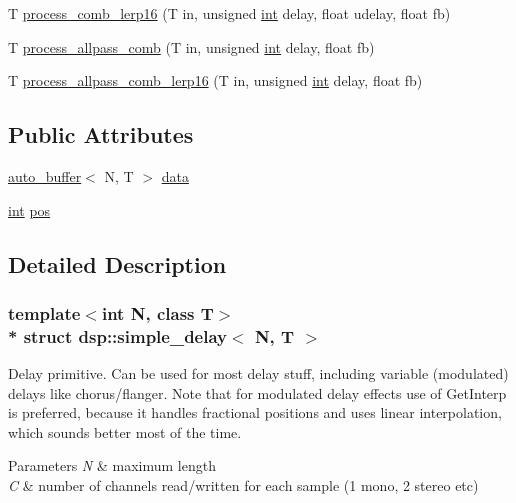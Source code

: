 \begin{DoxyCompactItemize}
\item 
T \hyperlink{structdsp_1_1simple__delay_a85b17601c47142064b525f3feefe2d58}{process\+\_\+comb\+\_\+lerp16} (T in, unsigned \hyperlink{tk_8h_a83f82f76e7fed06f4c49d2db94028a6d}{int} delay, float udelay, float fb)
\item 
T \hyperlink{structdsp_1_1simple__delay_ab4db01f4d6f98b2d901216369e5d9816}{process\+\_\+allpass\+\_\+comb} (T in, unsigned \hyperlink{tk_8h_a83f82f76e7fed06f4c49d2db94028a6d}{int} delay, float fb)
\item 
T \hyperlink{structdsp_1_1simple__delay_ae84725c74f1d55bcc1ba54e5bb4320fb}{process\+\_\+allpass\+\_\+comb\+\_\+lerp16} (T in, unsigned \hyperlink{tk_8h_a83f82f76e7fed06f4c49d2db94028a6d}{int} delay, float fb)
\end{DoxyCompactItemize}
\subsection*{Public Attributes}
\begin{DoxyCompactItemize}
\item 
\hyperlink{classdsp_1_1auto__buffer}{auto\+\_\+buffer}$<$ N, T $>$ \hyperlink{structdsp_1_1simple__delay_a3f3b931dc9dc0e55acc53d256caf3269}{data}
\item 
\hyperlink{tk_8h_a83f82f76e7fed06f4c49d2db94028a6d}{int} \hyperlink{structdsp_1_1simple__delay_a52cf3237061eecf494828977959bcbd8}{pos}
\end{DoxyCompactItemize}


\subsection{Detailed Description}
\subsubsection*{template$<$int N, class T$>$\\*
struct dsp\+::simple\+\_\+delay$<$ N, T $>$}

Delay primitive. Can be used for most delay stuff, including variable (modulated) delays like chorus/flanger. Note that for modulated delay effects use of Get\+Interp is preferred, because it handles fractional positions and uses linear interpolation, which sounds better most of the time.


\begin{DoxyParams}{Parameters}
{\em N} & maximum length \\
\hline
{\em C} & number of channels read/written for each sample (1 mono, 2 stereo etc) \\
\hline
\end{DoxyParams}


